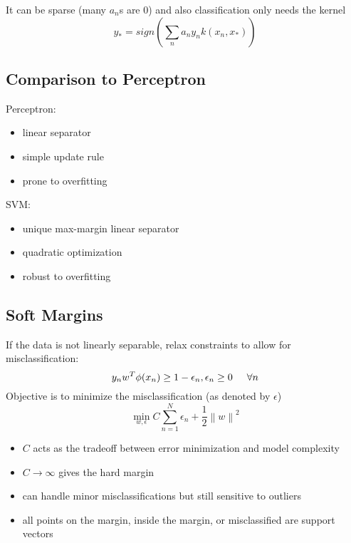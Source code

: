 \documentclass[]{article}
\theoremstyle{definition}
\newcommand\norm[1]{\left\lVert#1\right\rVert}
\begin{document}
    It can be sparse (many $a_n$s are 0) and also classification only needs the kernel
    \begin{equation*}
        y_* = sign(\sum_n a_n y_n k(x_n, x_*))
    \end{equation*}


    \subsection{Comparison to Perceptron}
    \label{sub:comparison_to_perceptron}

    Perceptron:
    \begin{itemize}
        \item linear separator
        \item simple update rule
        \item prone to overfitting
    \end{itemize}
    SVM:
    \begin{itemize}
        \item unique max-margin linear separator
        \item quadratic optimization
        \item robust to overfitting
    \end{itemize}

    \subsection{Soft Margins}
    \label{sub:soft_margins}
    If the data is not linearly separable, relax constraints to allow for misclassification:
    \begin{equation*}
        y_n w^T \phi(x_n) \geq 1 - \epsilon_n, \epsilon_n \geq 0 \hspace{5mm}  \forall n
    \end{equation*} 
    Objective is to minimize the misclassification (as denoted by $\epsilon$)
    \begin{equation*}
        \min_{w, \epsilon} C \sum_{n=1}^N \epsilon_n + \frac{1}{2} \norm w^2
    \end{equation*}

    \begin{itemize}
        \item $C$ acts as the tradeoff between error minimization and model complexity
        \item $C \rightarrow \infty$ gives the hard margin
        \item can handle minor misclassifications but still sensitive to outliers
        \item all points on the margin, inside the margin, or misclassified are support vectors
    \end{itemize}
\end{document}
